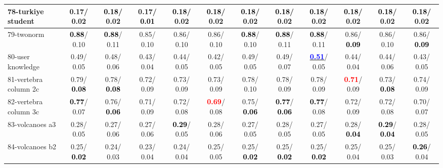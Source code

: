 \begin{table}[h]
\begin{center}
{\begin{tabular}{lc|c|c|c|c|c|c|c|c|c|c}
78-turkiye student &   0.17/  0.02 & \textcolor{black}{\textbf{  0.18}}/  0.02 &   0.17/\textcolor{black}{\textbf{  0.01}} & \textcolor{black}{\textbf{  0.18}}/  0.02 & \textcolor{black}{\textbf{  0.18}}/  0.02 & \textcolor{black}{\textbf{  0.18}}/  0.02 & \textcolor{black}{\textbf{  0.18}}/  0.02 & \textcolor{black}{\textbf{  0.18}}/  0.02 & \textcolor{black}{\textbf{  0.18}}/  0.02 & \textcolor{black}{\textbf{  0.18}}/  0.02 & \textcolor{black}{\textbf{  0.18}}/  0.02 \\ \hline
79-twonorm & \textcolor{black}{\textbf{  0.88}}/  0.10 & \textcolor{black}{\textbf{  0.88}}/  0.11 &   0.85/  0.10 &   0.86/  0.10 &   0.86/  0.10 & \textcolor{black}{\textbf{  0.88}}/  0.10 & \textcolor{black}{\textbf{  0.88}}/  0.11 & \textcolor{black}{\textbf{  0.88}}/  0.11 &   0.86/\textcolor{black}{\textbf{  0.09}} &   0.86/  0.10 &   0.86/\textcolor{black}{\textbf{  0.09}} \\
80-user knowledge &   0.49/  0.05 &   0.48/  0.06 &   0.43/  0.04 &   0.44/  0.05 &   0.42/  0.05 &   0.49/  0.05 &   0.49/  0.07 & \underline{\textcolor{blue}{\textbf{  0.51}}}/  0.05 &   0.44/  0.04 &   0.44/  0.06 &   0.43/  0.05 \\
81-vertebra column 2c &   0.79/\textcolor{black}{\textbf{  0.08}} &   0.78/\textcolor{black}{\textbf{  0.08}} &   0.72/  0.09 &   0.73/  0.09 &   0.73/  0.09 &   0.78/  0.10 &   0.78/  0.09 &   0.78/  0.09 & \textcolor{red}{\textbf{  0.71}}/  0.09 &   0.73/\textcolor{black}{\textbf{  0.08}} &   0.74/  0.09 \\
82-vertebra column 3c & \textcolor{black}{\textbf{  0.77}}/  0.07 &   0.76/\textcolor{black}{\textbf{  0.06}} &   0.71/  0.09 &   0.72/  0.08 & \textcolor{red}{\textbf{  0.69}}/  0.08 &   0.75/\textcolor{black}{\textbf{  0.06}} & \textcolor{black}{\textbf{  0.77}}/\textcolor{black}{\textbf{  0.06}} & \textcolor{black}{\textbf{  0.77}}/  0.08 &   0.72/  0.09 &   0.72/  0.08 &   0.70/  0.07 \\
83-volcanoes a3 &   0.28/  0.05 &   0.27/  0.06 &   0.27/  0.06 & \textcolor{black}{\textbf{  0.29}}/  0.05 &   0.28/  0.06 &   0.27/  0.05 &   0.28/  0.05 &   0.27/  0.05 &   0.28/\textcolor{black}{\textbf{  0.04}} & \textcolor{black}{\textbf{  0.29}}/\textcolor{black}{\textbf{  0.04}} &   0.28/  0.05 \\
84-volcanoes b2 &   0.25/\textcolor{black}{\textbf{  0.02}} &   0.24/  0.03 &   0.23/  0.04 &   0.24/  0.04 &   0.25/  0.05 &   0.25/\textcolor{black}{\textbf{  0.02}} &   0.25/\textcolor{black}{\textbf{  0.02}} &   0.25/\textcolor{black}{\textbf{  0.02}} &   0.25/  0.04 &   0.25/  0.03 & \textcolor{black}{\textbf{  0.26}}/  0.04 \\

\end{tabular}}
\end{center}
\end{table}
